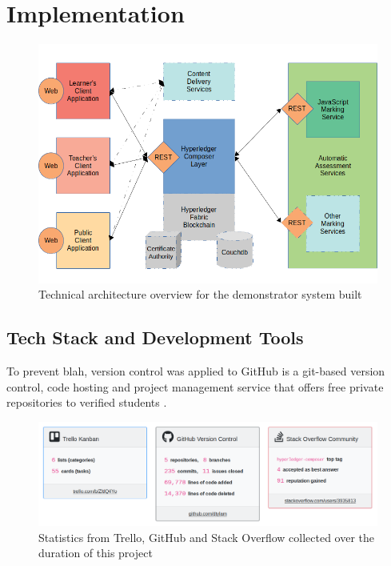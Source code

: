 \chapter{Implementation}

\graphicspath{{Chapter6/Figs/Raster/}{Chapter6/Figs/PDF/}{Chapter6/Figs/}}

\begin{figure}[!ht] 
    \centering    
    \includegraphics[width=1.0\textwidth]{architecture}
    \caption[Technical architecture overview for the demonstrator system built]
        {Technical architecture overview for the demonstrator system built}
    \label{fig:architecture}
\end{figure} 

\section{Tech Stack and Development Tools}

To prevent blah, version control was applied to 
GitHub is a git-based version control, code hosting and project management service that offers free 
private repositories to verified students \citep{github2018education}.

\begin{figure}[!hb] 
    \centering    
    \includegraphics[width=1.0\textwidth]{platforms_stats}
    \caption[Project Management Statistics]
        {Statistics from Trello, GitHub and Stack Overflow collected over the duration of this project} 
    \label{fig:platforms_stats}
\end{figure}

